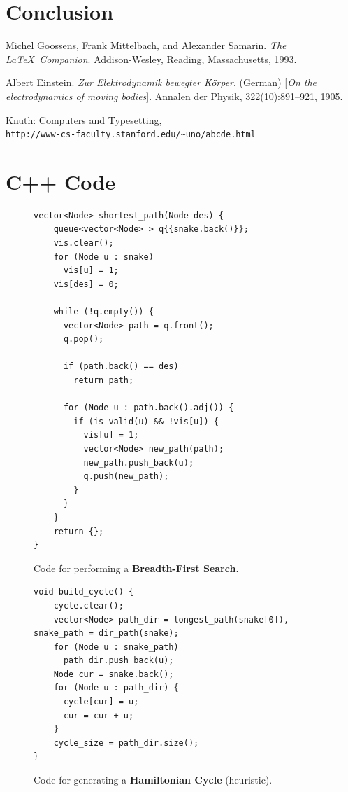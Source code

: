 \documentclass[12pt]{article}
\begin{document}
\section{Conclusion}

\pagebreak
\begin{thebibliography}{9}
Michel Goossens, Frank Mittelbach, and Alexander Samarin. 
\textit{The \LaTeX\ Companion}. 
Addison-Wesley, Reading, Massachusetts, 1993.

Albert Einstein. 
\textit{Zur Elektrodynamik bewegter K{\"o}rper}. (German) 
[\textit{On the electrodynamics of moving bodies}]. 
Annalen der Physik, 322(10):891–921, 1905.

Knuth: Computers and Typesetting,
\\\texttt{http://www-cs-faculty.stanford.edu/\~{}uno/abcde.html}
\end{thebibliography}
\pagebreak


\appendix
\section{C++ Code}\label{sec:appendix_code}

\begin{figure}[!h]
\centering
\begin{lstlisting}
vector<Node> shortest_path(Node des) {
    queue<vector<Node> > q{{snake.back()}};
    vis.clear();
    for (Node u : snake)
      vis[u] = 1;
    vis[des] = 0;
    
    while (!q.empty()) {
      vector<Node> path = q.front();
      q.pop();
     
      if (path.back() == des)
        return path;
        
      for (Node u : path.back().adj()) {
        if (is_valid(u) && !vis[u]) {
          vis[u] = 1;
          vector<Node> new_path(path);
          new_path.push_back(u);
          q.push(new_path);
        }
      }
    }
    return {};
}
\end{lstlisting}
\caption{Code for performing a \textbf{Breadth-First Search}.}
\label{fig:bfs_code}
\end{figure}

\begin{figure}[!h]
\begin{lstlisting}
void build_cycle() {
    cycle.clear();
    vector<Node> path_dir = longest_path(snake[0]), snake_path = dir_path(snake);
    for (Node u : snake_path)
      path_dir.push_back(u);
    Node cur = snake.back();
    for (Node u : path_dir) {
      cycle[cur] = u;
      cur = cur + u;
    }
    cycle_size = path_dir.size();
}
\end{lstlisting}
\caption{Code for generating a \textbf{Hamiltonian Cycle} (heuristic).}
\label{fig:cycle_code}
\end{figure}
\end{document}
